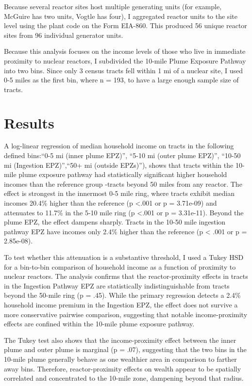 \documentclass[
]{article}
\begin{document}
Because several reactor sites host multiple generating units (for
example, McGuire has two units, Vogtle has four), I aggregated reactor
units to the site level using the plant code on the Form EIA-860. This
produced 56 unique reactor sites from 96 individual generator units.

Because this analysis focuses on the income levels of those who live in
immediate proximity to nuclear reactors, I subdivided the 10-mile Plume
Exposure Pathway into two bins. Since only 3 census tracts fell within 1
mi of a nuclear site, I used 0-5 miles as the first bin, where n = 193,
to have a large enough sample size of tracts.

\section{Results}\label{results}

A log-linear regression of median household income on tracts in the
following defined bins:``0-5 mi (inner plume EPZ)'', ``5-10 mi (outer
plume EPZ)'', ``10-50 mi (Ingestion EPZ)'',``50+ mi (outside EPZs)''),
shows that tracts within the 10-mile plume exposure pathway had
statistically significant higher household incomes than the reference
group -tracts beyond 50 miles from any reactor. The effect is strongest
in the innermost 0-5 mile ring, where tracts exhibit median incomes
20.4\% higher than the reference (p \textless.001 or p = 3.71e-09) and
attenuates to 11.7\% in the 5-10 mile ring (p \textless.001 or p =
3.31e-11). Beyond the plume EPZ, the effect dampens sharply. Tracts in
the 10-50 mile ingestion pathway EPZ have incomes only 2.4\% higher than
the reference (p \textless{} .001 or p = 2.85e-08).

To test whether this attenuation is a substantive threshold, I used a
Tukey HSD for a bin-to-bin comparison of household income as a function
of proximity to nuclear reactors. The analysis confirms that the
reactor-proximity effects in tracts in the Ingestion Pathway EPZ are
statistically indistinguishable from tracts beyond the 50-mile ring (p =
.45). While the primary regression detects a 2.4\% household income
premium in the Ingestion EPZ, the effect does not survive a more
conservative pairwise comparison, suggesting that notable
income-proximity effects are confined within the 10-mile plume exposure
pathway.

The Tukey test also shows that the income-proximity effect between the
inner plume and outer plume is marginal (p = .07), suggesting that the
two bins in the 10-mile plume generally behave as one wealthier area in
comparison to farther away bins. Therefore, reactor-proximity effects on
wealth appear to be spatially correlated and concentrated to the 10-mile
zone, dampening beyond that radius.
\end{document}
